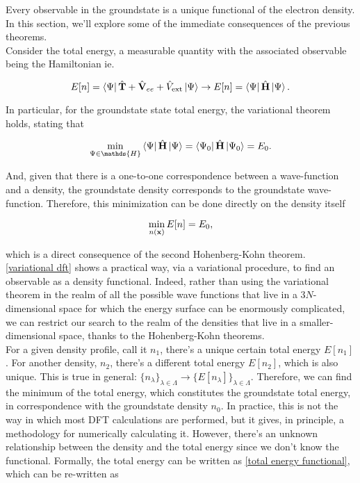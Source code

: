\documentclass{homework}
\begin{document}
Every observable in the groundstate is a unique functional of the electron density. In this section, we'll explore some of the immediate consequences of the previous theorems. \\

Consider the total energy, a measurable quantity with the associated observable being the Hamiltonian ie. 

\begin{equation}
    E[n] = \bra{\Psi} \hat{\bf T}+\hat{\bf V}_{ee}+\hat{V}_{\textnormal{ext}}\ket{\Psi} \rightarrow  E[n] = \bra{\Psi} \hat{\bf H}\ket{\Psi}.
    \label{total energy functional}
\end{equation}

In particular, for the groundstate state total energy, the variational theorem holds, stating that 

\begin{equation}
    \min_{\Psi \in \mathds{H}} \bra{\Psi} \hat{\bf H}\ket{\Psi} =  \bra{\Psi_0} \hat{\bf H}\ket{\Psi_0} = E_0.
\end{equation}

And, given that there is a one-to-one correspondence between a wave-function and a density, the groundstate density corresponds to the groundstate wave-function. Therefore, this minimization can be done directly on the density itself 

\begin{equation}
\min_{n({\bf x})} E[n] = E_0,
\label{variational dft}    
\end{equation}

which is a direct consequence of the second Hohenberg-Kohn theorem. \eqref{variational dft} shows a practical way, via a variational procedure, to find an observable as a density functional. Indeed, rather than using the variational theorem in the realm of all the possible wave functions that live in a $3N$-dimensional space for which the energy surface can be enormously complicated, we can restrict our search to the realm of the densities that live in a smaller-dimensional space, thanks to the Hohenberg-Kohn theorems. \\

For a given density profile, call it $n_1$, there's a unique certain total energy $E[n_1]$. For another density, $n_2$, there's a different total energy $E[n_2]$, which is also unique. This is true in general: $\{n_\lambda\}_{\lambda \in \Lambda} \rightarrow \{E[n_\lambda]\}_{\lambda \in \Lambda}$. Therefore, we can find the minimum of the total energy, which constitutes the groundstate total energy, in correspondence with the groundstate density $n_0$. In practice, this is not the way in which most DFT calculations are performed, but it gives, in principle, a methodology for numerically calculating it. However, there's an unknown relationship between the density and the total energy since we don't know the functional. Formally, the total energy can be written as \eqref{total energy functional}, which can be re-written as 
\end{document}
